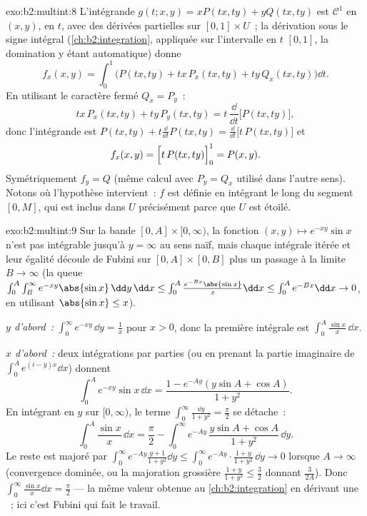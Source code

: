 \begin{solution}{exo:b2:multint:8}
L'intégrande $g(t; x, y) = xP(tx, ty) + yQ(tx, ty)$ est
$\mathcal{C}^1$ en $(x, y)$,  en $t$, avec des dérivées
partielles  sur $[0,1] \times U$~; la dérivation sous le signe
intégral (\cref{ch:b2:integration}, appliquée sur l'intervalle 
en $t$ $[0,1]$, la domination y étant automatique)
donne
\[
f_x(x, y)
= \int_0^1 \bigl(P(tx, ty) + tx\,P_x(tx, ty)
+ ty\,Q_x(tx, ty)\bigr)\dd t .
\]
En utilisant le caractère fermé $Q_x = P_y$~:
\[
tx\,P_x(tx, ty) + ty\,P_y(tx, ty)
= t\,\frac{\dd}{\dd t}\bigl[P(tx, ty)\bigr] ,
\]
donc l'intégrande est $P(tx, ty) + t\frac{\dd}{\dd t}P(tx, ty) =
\frac{\dd}{\dd t}\bigl[t\,P(tx, ty)\bigr]$ et
\[
f_x(x, y) = \Bigl[t\,P(tx, ty)\Bigr]_0^1 = P(x, y) .
\]
Symétriquement $f_y = Q$ (même calcul avec $P_y = Q_x$ utilisé
dans l'autre sens). Notons où l'hypothèse intervient~: $f$ est définie
en intégrant le long du segment $[0, M]$, qui est inclus dans $U$
précisément parce que $U$ est étoilé.
\end{solution}

\begin{solution}{exo:b2:multint:9}
Sur la bande $[0, A] \times [0, \infty)$, la fonction $(x, y)
\mapsto e^{-xy}\sin x$ n'est pas  intégrable jusqu'à $y =
\infty$  au sens naïf, mais chaque intégrale itérée
 et leur égalité découle de Fubini sur $[0, A]
\times [0, B]$ plus un passage à la limite $B \to \infty$ (la queue
$\int_0^A\int_B^\infty e^{-xy}\abs{\sin x}\,\dd y\,\dd x \leq
\int_0^A \frac{e^{-Bx}\abs{\sin x}}{x}\dd x \leq \int_0^A e^{-Bx}
\dd x\to 0$, en utilisant $\abs{\sin x} \leq x$).

\emph{$y$ d'abord~:} $\int_0^\infty e^{-xy}\,\dd y = \frac1x$ pour $x
> 0$, donc la première intégrale est $\int_0^A \frac{\sin x}{x}\,\dd x$.

\emph{$x$ d'abord~:} deux intégrations par parties (ou en prenant la
partie imaginaire de $\int_0^A e^{(i - y)x}\dd x$) donnent
\[
\int_0^A e^{-xy}\sin x\,\dd x
= \frac{1 - e^{-Ay}(y\sin A + \cos A)}{1 + y^2} .
\]
En intégrant en $y$ sur $[0, \infty)$, le terme $\int_0^\infty
\frac{\dd y}{1 + y^2} = \frac\pi2$ se détache~:
\[
\int_0^A \frac{\sin x}{x}\,\dd x
= \frac{\pi}{2}
- \int_0^\infty e^{-Ay}\,\frac{y\sin A + \cos A}{1 + y^2}\,\dd y .
\]
Le reste est majoré par $\int_0^\infty e^{-Ay}\frac{y +
1}{1 + y^2}\dd y \leq \int_0^\infty e^{-Ay}\cdot\frac{1+y}{1+y^2}
\,\dd y \to 0$ lorsque $A \to \infty$ (convergence dominée, ou la
majoration grossière $\frac{1 + y}{1 + y^2} \leq \frac32$ donnant
$\frac{3}{2A}$). Donc $\int_0^\infty\frac{\sin x}{x}\dd x =
\frac\pi2$ --- la même valeur obtenue au
\cref{ch:b2:integration} en dérivant une ~;
ici c'est Fubini qui fait le travail.
\end{solution}

